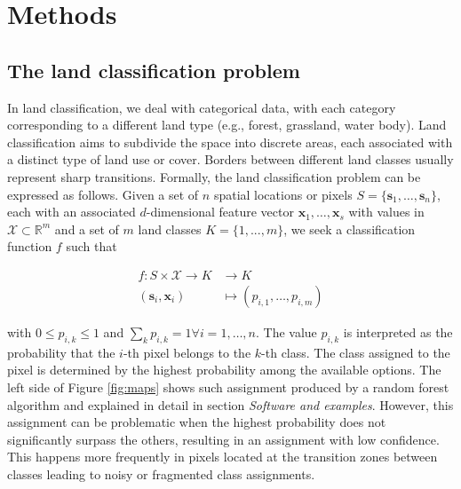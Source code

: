 \documentclass[
  shortnames]{jss}
\begin{document}
\hypertarget{methods}{%
\section{Methods}\label{methods}}

\hypertarget{the-land-classification-problem}{%
\subsection{The land classification problem}\label{the-land-classification-problem}}

In land classification, we deal with categorical data, with each category corresponding to a different land type (e.g., forest, grassland, water body). Land classification aims to subdivide the space into discrete areas, each associated with a distinct type of land use or cover. Borders between different land classes usually represent sharp transitions. Formally,
the land classification problem can be expressed as follows. Given a set of \(n\) spatial locations or pixels \(S = \{ \mathbf{s}_1, \ldots, \mathbf{s}_n \}\), each with an associated \(d\)-dimensional feature vector \(\mathbf{x}_1, \ldots, \mathbf{x}_s\) with values in \(\mathcal{X} \subset \mathbb{R}^m\) and a set of \(m\) land classes \(K = \{ 1, ..., m \}\), we seek a classification function \(f\) such that

\begin{align}
f\colon S \times \mathcal{X} \to K & \longrightarrow K \nonumber \\
(\mathbf{s}_i, \mathbf{x}_i) & \longmapsto (p_{i,1}, \ldots, p_{i,m}) 
\label{eq:classificationf}
\end{align}

with \(0 \leq p_{i,k} \leq 1\) and \(\sum_k p_{i,k} = 1 \forall i = 1, \ldots, n\). The value \(p_{i,k}\) is interpreted as the probability that the \(i\)-th pixel belongs to the \(k\)-th class. The class assigned to the pixel is determined by the highest probability among the available options. The left side of Figure \ref{fig:maps} shows such assignment produced by a random forest algorithm and explained in detail in section \textit{Software and examples}. However, this assignment can be problematic when the highest probability does not significantly surpass the others, resulting in an assignment with low confidence. This happens more frequently in pixels located at the transition zones between classes leading to noisy or fragmented class assignments.
\end{document}
